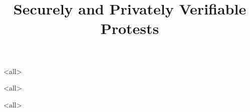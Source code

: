 \title{%
  Securely and Privately Verifiable Protests
}

\maketitle

\mode*

\begin{abstract}
  
\end{abstract}

\clearpage
\tableofcontents
\clearpage

\mode<all>


\mode<all>



%

\mode<all>




\begin{frame}[allowframebreaks]
  \printbibliography{}
\end{frame}
